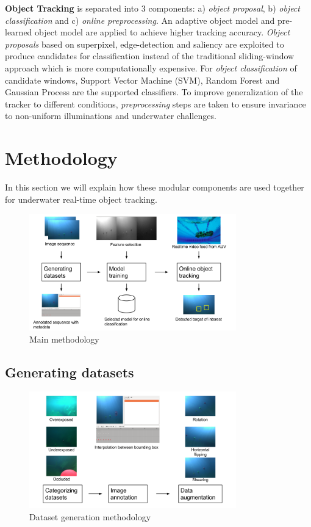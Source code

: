 \documentclass[fypca]{socreport}
\begin{document}
\textbf{Object Tracking} is separated into 3 components: a) \textit{object
  proposal}, b) \textit{object classification} and c) \textit{online preprocessing}. An
adaptive object model and pre-learned object model are applied to achieve higher
tracking accuracy. \textit{Object proposals} based on superpixel, edge-detection
and saliency are exploited to produce candidates for classification instead of
the traditional sliding-window approach which is more computationally expensive.
For \textit{object classification} of candidate windows, Support Vector Machine
(SVM), Random Forest and Gaussian Process are the supported classifiers.
To improve generalization of the tracker to different conditions,
\textit{preprocessing} steps are taken to ensure invariance to non-uniform
illuminations and underwater challenges.

\newpage
\section{Methodology}

In this section we will explain how these modular components are used together
for underwater real-time object tracking.

\begin{figure}[H]
\centering
  \includegraphics[width=0.8\textwidth, height=0.3\textheight]{method.png}
  \caption{Main methodology}
  \label{fig:main_methodology}
\end{figure}

\subsection{Generating datasets}

\begin{figure}[H]
\centering
  \includegraphics[width=0.8\textwidth, height=0.3\textheight]{dataset_method.png}
  \caption{Dataset generation methodology}
  \label{fig:dataset_methodology}
\end{figure}
\end{document}
